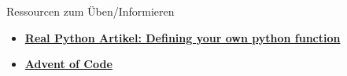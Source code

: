 \begin{frame}{Ressourcen zum Üben/Informieren}
    \begin{itemize}
        \item \textbf{\href{https://realpython.com/defining-your-own-python-function/}{Real Python Artikel: Defining your own python function}}
        \item \textbf{\href{https://adventofcode.com/}{Advent of Code}}
    \end{itemize}
\end{frame}


